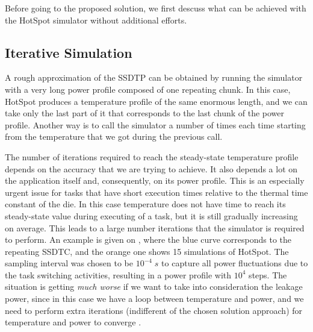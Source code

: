 Before going to the proposed solution, we first descuss what can be achieved with the HotSpot simulator without additional efforts.

\subsection{Iterative Simulation}
A rough approximation of the SSDTP can be obtained by running the simulator with a very long power profile composed of one repeating chunk. In this case, HotSpot produces a temperature profile of the same enormous length, and we can take only the last part of it that corresponds to the last chunk of the power profile. Another way is to call the simulator a number of times each time starting from the temperature that we got during the previous call.

The number of iterations required to reach the steady-state temperature profile depends on the accuracy that we are trying to achieve. It also depends a lot on the application itself and, consequently, on its power profile. This is an especially urgent issue for tasks that have short execution times relative to the thermal time constant of the die. In this case temperature does not have time to reach its steady-state value during executing of a task, but it is still gradually increasing on average. This leads to a large number iterations that the simulator is required to perform. An example is given on , where the blue curve corresponds to the repeating SSDTC, and the orange one shows 15 simulations of HotSpot. The sampling interval was chosen to be $10^{-4} \; s$ to capture all power fluctuations due to the task switching activities, resulting in a power profile with $10^4$ steps. The situation is getting \emph{much worse} if we want to take into consideration the leakage power, since in this case we have a loop between temperature and power, and we need to perform extra iterations (indifferent of the chosen solution approach) for temperature and power to converge \cite{liu2007}.

